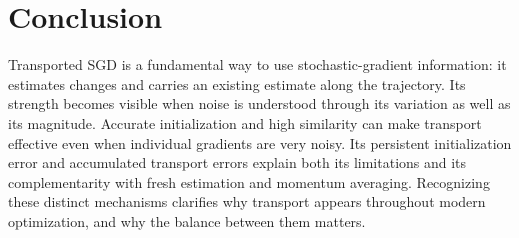\section{Conclusion}
\label{sec:conclusion}

Transported SGD is a fundamental way to use stochastic-gradient
information: it estimates changes and carries an existing estimate
along the trajectory. Its strength becomes visible when noise is
understood through its variation as well as its magnitude. Accurate
initialization and high similarity can make transport effective even
when individual gradients are very noisy. Its persistent initialization
error and accumulated transport errors explain both its limitations
and its complementarity with fresh estimation and momentum averaging.
Recognizing these distinct mechanisms clarifies why transport appears
throughout modern optimization, and why the balance between them matters.
